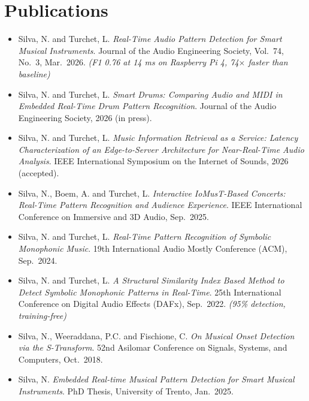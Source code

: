 \documentclass[11pt]{article}
\begin{document}
\section*{Publications }
\begin{itemize}[leftmargin=1.2em, itemsep=-0.25em]
    \item Silva, N. and Turchet, L. \textit{Real-Time Audio Pattern Detection for Smart Musical Instruments}. Journal of the Audio Engineering Society, Vol.~74, No.~3, Mar.~2026. \textit{(F1 0.76 at 14 ms on Raspberry Pi 4, 74$\times$ faster than baseline)}
    \item Silva, N. and Turchet, L. \textit{Smart Drums: Comparing Audio and MIDI in Embedded Real-Time Drum Pattern Recognition}. Journal of the Audio Engineering Society, 2026 (in press).
    \item Silva, N. and Turchet, L. \textit{Music Information Retrieval as a Service: Latency Characterization of an Edge-to-Server Architecture for Near-Real-Time Audio Analysis}. IEEE International Symposium on the Internet of Sounds, 2026 (accepted).
    \item Silva, N., Boem, A. and Turchet, L. \textit{Interactive IoMusT-Based Concerts: Real-Time Pattern Recognition and Audience Experience}. IEEE International Conference on Immersive and 3D Audio, Sep.~2025.
    \item Silva, N. and Turchet, L. \textit{Real-Time Pattern Recognition of Symbolic Monophonic Music}. 19th International Audio Mostly Conference (ACM), Sep.~2024.
    \item Silva, N. and Turchet, L. \textit{A Structural Similarity Index Based Method to Detect Symbolic Monophonic Patterns in Real-Time}. 25th International Conference on Digital Audio Effects (DAFx), Sep.~2022. \textit{(95\% detection, training-free)}
    \item Silva, N., Weeraddana, P.C. and Fischione, C. \textit{On Musical Onset Detection via the S-Transform}. 52nd Asilomar Conference on Signals, Systems, and Computers, Oct.~2018.
    \item Silva, N. \textit{Embedded Real-time Musical Pattern Detection for Smart Musical Instruments}. PhD Thesis, University of Trento, Jan.~2025.
\end{itemize}
\end{document}
